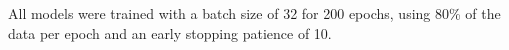 \documentclass[a4paper]{article}
\begin{document}
        All models were trained with a batch size of 32 for 200 epochs, using 80\% of the data per epoch and an early stopping patience of 10.
 

    
    
    

\usetikzlibrary{positioning, arrows.meta, calc, decorations.pathreplacing}
\end{document}
